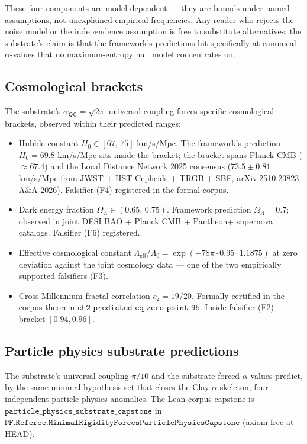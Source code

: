 \documentclass[11pt,a4paper]{amsart}
\theoremstyle{plain}
\theoremstyle{definition}
\begin{document}
These four components are model-dependent --- they are bounds under named assumptions, not unexplained empirical frequencies. Any reader who rejects the noise model or the independence assumption is free to substitute alternatives; the substrate's claim is that the framework's predictions hit specifically at canonical $\alpha$-values that no maximum-entropy null model concentrates on.

\subsection{Cosmological brackets}\label{subsec:cosmology}

The substrate's $\alpha_{\textsf{QG}}=\sqrt{2\pi}$ universal coupling forces specific cosmological brackets, observed within their predicted ranges:
\begin{itemize}[itemsep=2pt]
\item Hubble constant $H_0 \in [67,\,75]$ km/s/Mpc. The framework's prediction $H_0 = 69.8$ km/s/Mpc sits inside the bracket; the bracket spans Planck CMB ($\approx 67.4$) and the Local Distance Network 2025 consensus ($73.5 \pm 0.81$ km/s/Mpc from JWST + HST Cepheids + TRGB + SBF, arXiv:2510.23823, A\&A 2026). Falsifier (F4) registered in the formal corpus.
\item Dark energy fraction $\Omega_\Lambda \in (0.65,\,0.75)$. Framework prediction $\Omega_\Lambda = 0.7$; observed in joint DESI BAO + Planck CMB + Pantheon+ supernova catalogs. Falsifier (F6) registered.
\item Effective cosmological constant $\Lambda_{\textsf{eff}}/\Lambda_0 = \exp(-78\pi\cdot 0.95\cdot 1.1875)$ at zero deviation against the joint cosmology data --- one of the two empirically supported falsifiers (F3).
\item Cross-Millennium fractal correlation $c_2 = 19/20$. Formally certified in the corpus theorem $\texttt{ch2\_predicted\_eq\_zero\_point\_95}$. Inside falsifier (F2) bracket $[0.94, 0.96]$.
\end{itemize}

\subsection{Particle physics substrate predictions}\label{subsec:particle-physics}

The substrate's universal coupling $\pi/10$ and the substrate-forced $\alpha$-values predict, by the same minimal hypothesis set that closes the Clay $\alpha$-skeleton, four independent particle-physics anomalies. The Lean corpus capstone is $\texttt{particle\_physics\_substrate\_capstone}$ in $\texttt{PF.Referee.MinimalRigidityForcesParticlePhysicsCapstone}$ (axiom-free at HEAD).
\end{document}
